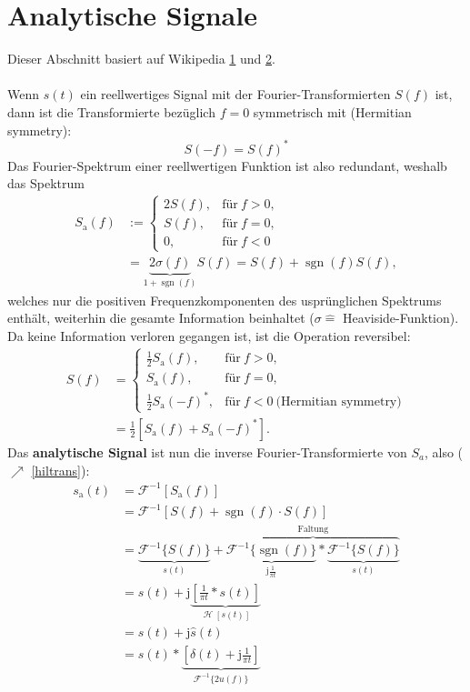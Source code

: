  \section{Analytische Signale}\label{ansig}
 Dieser Abschnitt basiert auf Wikipedia \href{https://en.wikipedia.org/wiki/Analytic_signal}{1} und \href{https://en.wikipedia.org/wiki/Phasor}{2}.\\\\
 Wenn $s(t)$ ein reellwertiges Signal mit der Fourier-Transformierten $S(f)$ ist, dann ist die Transformierte bezüglich $f=0$ symmetrisch mit (Hermitian symmetry):
 \begin{equation}
 	S(-f) = S(f)^*
 \end{equation}
 Das Fourier-Spektrum einer reellwertigen Funktion ist also redundant, weshalb das Spektrum
 \begin{align*}
 	S_\mathrm{a}(f) &:=
 	\begin{cases}
 		2S(f), &\text{für}\ f > 0,\\
 		S(f), &\text{für}\ f = 0,\\
 		0, &\text{für}\ f < 0
 	\end{cases}\\
 	&= \underbrace{2 \sigma(f)}_{1 + \operatorname{sgn}(f)}S(f) = S(f) + \operatorname{sgn}(f)S(f),
 \end{align*}
  welches nur die positiven Frequenzkomponenten des usprünglichen Spektrums enthält, weiterhin die gesamte Information beinhaltet ($\sigma \hat{=}$  Heaviside-Funktion). Da keine Information verloren gegangen ist, ist die Operation reversibel:
  \begin{align*}
  	S(f) &=
  	\begin{cases}
  		\frac{1}{2}S_\mathrm{a}(f), &\text{für}\ f > 0,\\
  		S_\mathrm{a}(f), &\text{für}\ f = 0,\\
  		\frac{1}{2}S_\mathrm{a}(-f)^*, &\text{für}\ f < 0\ \text{(Hermitian symmetry)}
  	\end{cases}\\
  	&= \frac{1}{2}[S_\mathrm{a}(f) + S_\mathrm{a}(-f)^*].
  \end{align*}
  Das \textbf{analytische Signal} ist nun die inverse Fourier-Transformierte von $S_a$, also ($\nearrow$ \ref{hiltrans}):
  \begin{align*}
  	s_\mathrm{a}(t) &= \mathcal{F}^{-1}[S_\mathrm{a}(f)]\\
  	&= \mathcal{F}^{-1}[S (f)+ \operatorname{sgn}(f) \cdot S(f)]\\
  	&= \underbrace{\mathcal{F}^{-1}\{S(f)\}}_{s(t)} + \overbrace{
  		\underbrace{\mathcal{F}^{-1}\{\operatorname{sgn}(f)\}}_{\mathrm{j}\frac{1}{\pi t}} * \underbrace{\mathcal{F}^{-1}\{S(f)\}}_{s(t)}
  	}^\text{Faltung}\\
  	&= s(t) + \mathrm{j}\underbrace{\left[{\frac{1}{\pi t}  } * s(t)\right]}_{\operatorname{\mathcal{H}}[s(t)]}\\
  	&= s(t) + \mathrm{j}\hat{s}(t)\\
  	&= s(t)*\underbrace{\left[\delta(t)+ \mathrm{j}{\frac{1}{\pi t}}\right]}_{\mathcal{F}^{-1}\{2u(f)\}}
  \end{align*}
